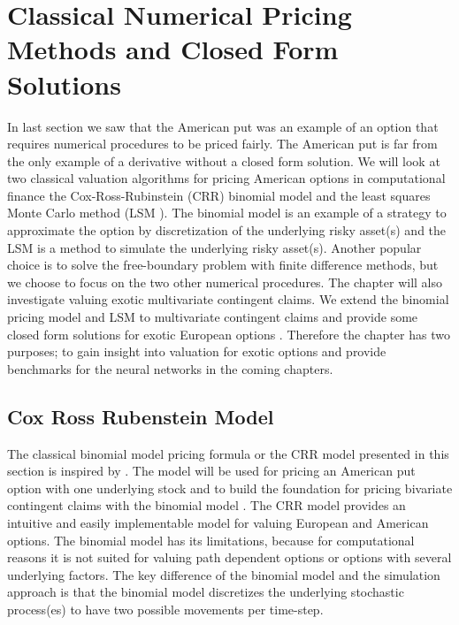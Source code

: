 \chapter{Classical Numerical Pricing Methods and Closed Form Solutions} %

\label{Chapter3} %

In last section we saw that the American put was an example of an option that requires numerical procedures to be priced fairly. The American put is far from the only example of a derivative without a closed form solution. We will look at two classical valuation algorithms for pricing American options in computational finance the Cox-Ross-Rubinstein (CRR) binomial model \parencite{CRR} and the least squares Monte Carlo method (LSM \parencite{LSM}). The binomial model is an example of a strategy to approximate the option by discretization of the underlying risky asset(s) and the LSM is a method to simulate the underlying risky asset(s). Another popular choice is to solve the free-boundary problem with finite difference methods, but we choose to focus on the two other numerical procedures. The chapter will also investigate valuing exotic multivariate contingent claims. We extend the binomial pricing model \parencite{NEK,BEG} and LSM to multivariate contingent claims and provide some closed form solutions for exotic European options \parencite{Johnson87, Ouwehand2006}. Therefore the chapter has two purposes; to gain insight into valuation for exotic options and provide benchmarks for the neural networks in the coming chapters.

\section{Cox Ross Rubenstein Model}\label{CRR}
The classical binomial model pricing formula or the CRR model presented in this section is inspired by \parencite{CRR,Hull,finKont}. The model will be used for pricing an American put option with one underlying stock and to build the foundation for pricing bivariate contingent claims with the binomial model \parencite{BEG}. The CRR model provides an intuitive and easily implementable model for valuing European and American options. The binomial model has its limitations, because for computational reasons it is not suited for valuing path dependent options or options with several underlying factors. The key difference of the binomial model and the simulation approach is that the binomial model discretizes the underlying stochastic process(es) to have two possible movements per time-step. \\

